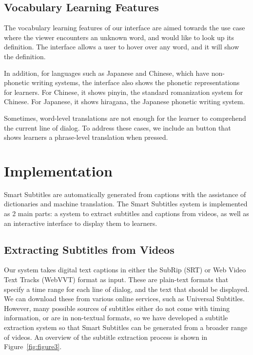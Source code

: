 \documentclass{sigchi}
\begin{document}
\subsection{Vocabulary Learning Features}

The vocabulary learning features of our interface are aimed towards the use case where the viewer encounters an unknown word, and would like to look up its definition. The interface allows a user to hover over any word, and it will show the definition.

In addition, for languages such as Japanese and Chinese, which have non-phonetic writing systems, the interface also shows the phonetic representations for learners. For Chinese, it shows pinyin, the standard romanization system for Chinese. For Japanese, it shows hiragana, the Japanese phonetic writing system.

Sometimes, word-level translations are not enough for the learner to comprehend the current line of dialog. To address these cases, we include an button that shows learners a phrase-level translation when pressed.

\section{Implementation}

Smart Subtitles are automatically generated from 
captions with the assistance of dictionaries and 
machine translation. The Smart Subtitles system
is implemented as 2 main parts:
a system to extract subtitles and captions from videos, as well as an interactive interface to display them to learners.

\subsection{Extracting Subtitles from Videos}

Our system takes digital text captions in either the SubRip (SRT) \cite{subrip} or Web Video Text Tracks (WebVVT) format \cite{webvvt} as input.
These are plain-text formats that specify a time range for each 
line of dialog, and the text that should be displayed.
We can download these from
various online services, such as Universal Subtitles.
However, many possible sources of subtitles either
do not come with timing information, or are in
non-textual formats, so we have developed 
a subtitle extraction system so that Smart Subtitles
can be generated from a broader range of videos.
An overview of the subtitle extraction process
is shown in Figure~\ref{fig:figure3}.
\end{document}
